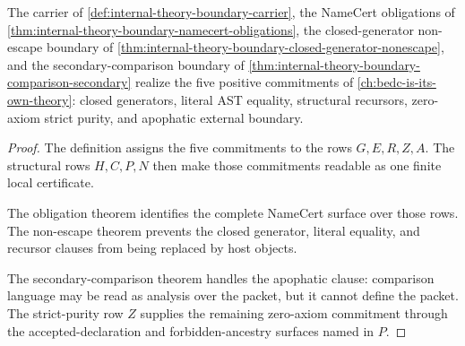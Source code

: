 \begin{theorem}
\label{thm:internal-theory-boundary-vision-concretization}
The carrier of \autoref{def:internal-theory-boundary-carrier}, the NameCert obligations of \autoref{thm:internal-theory-boundary-namecert-obligations}, the closed-generator non-escape boundary of \autoref{thm:internal-theory-boundary-closed-generator-nonescape}, and the secondary-comparison boundary of \autoref{thm:internal-theory-boundary-comparison-secondary} realize the five positive commitments of \autoref{ch:bedc-is-its-own-theory}: closed generators, literal AST equality, structural recursors, zero-axiom strict purity, and apophatic external boundary.
\end{theorem}
\begin{proof}
The definition assigns the five commitments to the rows $G,E,R,Z,A$. The structural rows $H,C,P,N$ then make those commitments readable as one finite local certificate.

The obligation theorem identifies the complete NameCert surface over those rows. The non-escape theorem prevents the closed generator, literal equality, and recursor clauses from being replaced by host objects.

The secondary-comparison theorem handles the apophatic clause: comparison language may be read as analysis over the packet, but it cannot define the packet. The strict-purity row $Z$ supplies the remaining zero-axiom commitment through the accepted-declaration and forbidden-ancestry surfaces named in $P$.
\end{proof}


\begin{closurestatus}{\InternalTheoryBoundaryUp}
  \theoryclosure{\seedClosure}
  \formalstatus{\unformalizedV}
\end{closurestatus}
